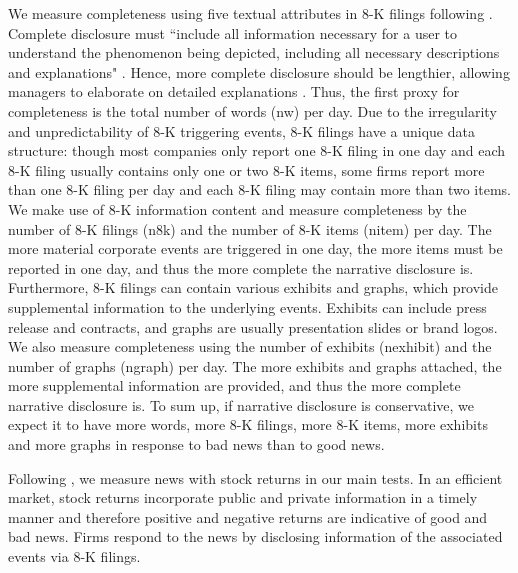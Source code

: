 \documentclass[letterpaper,12pt]{article}
\begin{document}
\begin{spacing}{1.5}
We measure completeness using five textual attributes in 8-K filings following . Complete disclosure must ``include all information necessary for a user to understand the phenomenon being depicted, including all necessary descriptions and explanations" \cite[QC12]{fasbConceptualFrameworkFinancial2018}. Hence, more complete disclosure should be lengthier, allowing managers to elaborate on detailed explanations \cite{leuzDisclosureCostCapital2009}. Thus, the first proxy for completeness is the total number of words (nw) per day. Due to the irregularity and unpredictability of 8-K triggering events, 8-K filings have a unique data structure: though most companies only report one 8-K filing in one day and each 8-K filing usually contains only one or two 8-K items, some firms report more than one 8-K filing per day and each 8-K filing may contain more than two items. We make use of 8-K information content and measure completeness by the number of 8-K filings (n8k) and the number of 8-K items (nitem) per day. The more material corporate events are triggered in one day, the more items must be reported in one day, and thus the more complete the narrative disclosure is. Furthermore, 8-K filings can contain various exhibits and graphs, which provide supplemental information to the underlying events. Exhibits can include press release and contracts, and graphs are usually presentation slides or brand logos. We also measure completeness using the number of exhibits (nexhibit) and the number of graphs (ngraph) per day. The more exhibits and graphs attached, the more supplemental information are provided, and thus the more complete narrative disclosure is.
To sum up, if narrative disclosure is conservative, we expect it to have more words, more 8-K filings, more 8-K items, more exhibits and more graphs in response to bad news than to good news.

Following , we measure news with stock returns in our main tests.
In an efficient market, stock returns incorporate public and private information in a timely manner and therefore positive and negative returns are indicative of good and bad news.
Firms respond to the news by disclosing information of the associated events via 8-K filings. 


\end{spacing}
\end{document}
